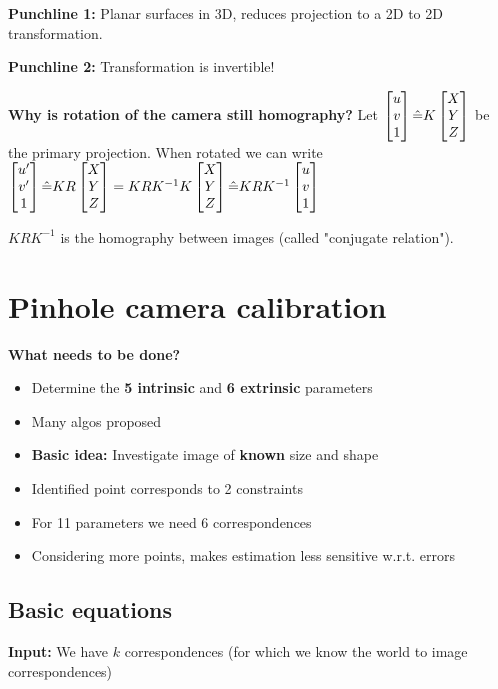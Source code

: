\textbf{Punchline 1:} Planar surfaces in 3D, reduces projection to a 2D to 2D transformation.

\textbf{Punchline 2:} Transformation is invertible!

\textbf{Why is rotation of the camera still homography?} Let $\left[\begin{matrix}u \\ v \\ 1\end{matrix}\right] \hat{=} K \left[\begin{matrix}X \\ Y \\ Z\end{matrix}\right]$ be the primary projection. When rotated we can write $\left[\begin{matrix}u' \\ v '\\ 1\end{matrix}\right] \hat{=} KR \left[\begin{matrix}X \\ Y \\ Z\end{matrix}\right] = KRK^{-1}K \left[\begin{matrix}X \\ Y \\ Z\end{matrix}\right] \hat{=}  KRK^{-1} \left[\begin{matrix}u \\ v \\ 1\end{matrix}\right]$

$KRK^{-1}$ is the homography between images (called "conjugate relation").

\section{Pinhole camera calibration}

\textbf{What needs to be done?} \begin{itemize}
    \item Determine the \textbf{5 intrinsic} and \textbf{6 extrinsic} parameters
    \item Many algos proposed
    \item \textbf{Basic idea:} Investigate image of \textbf{known} size and shape
    \item Identified point corresponds to 2 constraints
    \item For 11 parameters we need 6 correspondences
    \item Considering more points, makes estimation less sensitive w.r.t. errors
\end{itemize}

\subsection{Basic equations}

\textbf{Input:} We have $k$ correspondences (for which we know the world to image correspondences)

